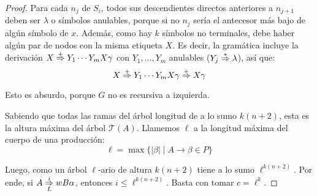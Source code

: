 \begin{proof}
    Para cada $n_j$ de $S_i$, todos sus descendientes directos anteriores a $n_{j + 1}$ deben ser $\lambda$ o símbolos anulables, porque si no $n_j$ sería el antecesor más bajo de algún símbolo de $x$. Además, como hay $k$ símbolos no terminales, debe haber algún par de nodos con la misma etiqueta $X$. Es decir, la gramática incluye la derivación $X \overset{+}{\Rightarrow} Y_1 \cdots Y_m X \gamma$ con $Y_1, \dots, Y_m$ anulables ($Y_j \overset{*}{\Rightarrow} \lambda$), así que:
    $$
        X \overset{+}{\Rightarrow} Y_1 \cdots Y_m X \gamma \overset{+}{\Rightarrow} X \gamma
    $$

    Esto es absurdo, porque $G$ no es recursiva a izquierda.

    Sabiendo que todas las ramas del árbol longitud de a lo sumo $k (n + 2)$, esta es la altura máxima del árbol $\mathcal T(A)$. Llamemos $\ell$ a la longitud máxima del cuerpo de una producción:
    $$
        \ell = \max \{ |\beta| \mid A \to \beta \in P \}
    $$

    Luego, como un árbol $\ell$-ario de altura $k (n + 2)$ tiene a lo sumo $\ell^{k (n + 2)}$. Por ende, si $A \overset{i}{\underset{L}{\Rightarrow}} w B \alpha$, entonces $i \leq \ell^{k (n + 2)}$. Basta con tomar $c = \ell^k$.
\end{proof}
